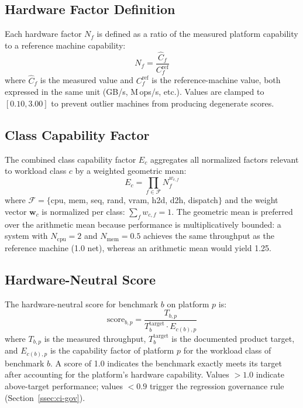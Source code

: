 \documentclass[conference]{IEEEtran}
\begin{document}
\subsection{Hardware Factor Definition}

Each hardware factor $N_f$ is defined as a ratio of the measured
platform capability to a reference machine capability:
\begin{equation}
  N_f = \frac{\hat{C}_f}{C_f^{\text{ref}}}
  \label{eq:nf}
\end{equation}
where $\hat{C}_f$ is the measured value and $C_f^{\text{ref}}$ is
the reference-machine value, both expressed in the same unit (GB/s,
M\,ops/s, etc.).
Values are clamped to $[0.10, 3.00]$ to prevent outlier machines
from producing degenerate scores.

\subsection{Class Capability Factor}

The combined class capability factor $E_c$ aggregates all
normalized factors relevant to workload class $c$ by a
weighted geometric mean:
\begin{equation}
  E_c = \prod_{f \in \mathcal{F}} N_f^{w_{c,f}}
  \label{eq:ec}
\end{equation}
where $\mathcal{F} = \{$cpu, mem, seq, rand, vram, h2d, d2h, dispatch$\}$
and the weight vector $\mathbf{w}_c$ is normalized per class:
$\sum_f w_{c,f} = 1$.
The geometric mean is preferred over the arithmetic mean because
performance is multiplicatively bounded: a system with
$N_{\text{cpu}} = 2$ and $N_{\text{mem}} = 0.5$ achieves the
same throughput as the reference machine (1.0 net), whereas an
arithmetic mean would yield 1.25.

\subsection{Hardware-Neutral Score}

The hardware-neutral score for benchmark $b$ on platform $p$ is:
\begin{equation}
  \text{score}_{b,p} = \frac{T_{b,p}}{T_{b}^{\text{target}} \cdot E_{c(b),p}}
  \label{eq:score}
\end{equation}
where $T_{b,p}$ is the measured throughput, $T_b^{\text{target}}$ is
the documented product target, and $E_{c(b),p}$ is the capability
factor of platform $p$ for the workload class of benchmark $b$.
A score of 1.0 indicates the benchmark exactly meets its target
after accounting for the platform's hardware capability.
Values $>1.0$ indicate above-target performance; values $<0.9$
trigger the regression governance rule (Section~\ref{ssec:ci-gov}).
\end{document}
